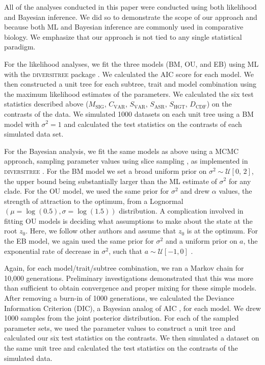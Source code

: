All of the analyses conducted in this paper were conducted using both likelihood and Bayesian inference. We did so to demonstrate the scope of our approach and because both ML and Bayesian inference are commonly used in comparative biology. We emphasize that our approach is not tied to any single statistical paradigm.

For the likelihood analyses, we fit the three models (BM, OU, and EB) using ML with the \textsc{diversitree} package \citep{FitzJohn2012}. We calculated the AIC score for each model. We then constructed a unit tree for each subtree, trait and model combination using the maximum likelihood estimates of the parameters. We calculated the six test statistics described above ($M_{\text{SIG}}$, $C_{\text{VAR}}$, $S_{\text{VAR}}$, $S_{\text{ASR}}$, $S_{\text{HGT}}$, $D_{\text{CDF}}$) on the contrasts of the data. We simulated 1000 datasets on each unit tree using a BM model with $\sigma^2=\text{1}$ and calculated the test statistics on the contrasts of each simulated data set. 

For the Bayesian analysis, we fit the same models as above using a MCMC approach, sampling parameter values using slice sampling \citep{Nealslice}, as implemented in  \textsc{diversitree} \citep{FitzJohn2012}. For the BM model we set a broad uniform prior on $\sigma^2 \sim \mathcal{U}[\text{0, 2}]$, the upper bound being substantially larger than the ML estimate of $\sigma^2$ for any clade. For the OU model, we used the same prior for $\sigma^2$ and drew $\alpha$ values, the strength of attraction to the optimum, from a Lognormal$(\mu=\log(\text{0.5}),\sigma= \log(\text{1.5}))$ distribution. A complication involved in fitting OU models is deciding what assumptions to make about the state at the root $z_0$. Here, we follow other authors \citep{ButlerKing2004,Harmon2010} and assume that $z_{\text{0}}$ is at the optimum. For the EB model, we again used the same prior for $\sigma^2$ and a uniform prior on $a$, the exponential rate of decrease in $\sigma^2$, such that $a \sim \mathcal{U}[-\text{1}, \text{0}]$ \citep[the minimum value is much more negative than we would typically expect;][]{SlaterPennell}.

Again, for each model/trait/subtree combination, we ran a Markov chain for 10,000 generations. Preliminary investigations demonstrated that this was more than sufficient to obtain convergence and proper mixing for these simple models. After removing a burn-in of 1000 generations, we calculated the Deviance Information Criterion (DIC), a Bayesian analog of AIC \citep{dic}, for each model. We drew 1000 samples from the joint posterior distribution. For each of the sampled parameter sets, we used the parameter values to construct a unit tree and calculated our six test statistics on the contrasts. We then simulated a dataset on the same unit tree and calculated the test statistics on the contrasts of the simulated data. 

